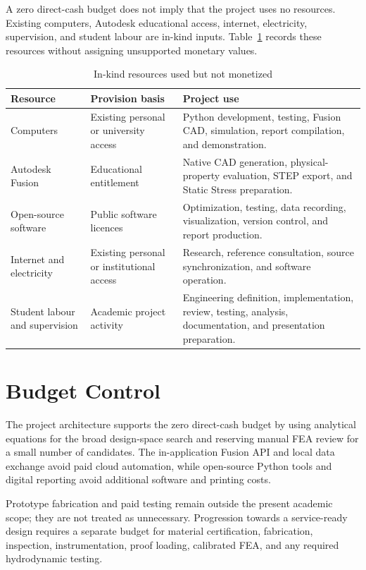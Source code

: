 A zero direct-cash budget does not imply that the project uses no resources.
Existing computers, Autodesk educational access, internet, electricity,
supervision, and student labour are in-kind inputs. Table~\ref{tab:in-kind}
records these resources without assigning unsupported monetary values.

\begin{table}[H]
\centering
\caption{In-kind resources used but not monetized}
\label{tab:in-kind}
\small
\begin{tabularx}{\textwidth}{
    >{\raggedright\arraybackslash}p{}
    >{\raggedright\arraybackslash}X
    >{\raggedright\arraybackslash}X}
\toprule
\textbf{Resource} & \textbf{Provision basis} & \textbf{Project use}\\
\midrule
Computers & Existing personal or university access &
Python development, testing, Fusion CAD, simulation, report compilation, and
demonstration.\\

Autodesk Fusion & Educational entitlement &
Native CAD generation, physical-property evaluation, STEP export, and Static
Stress preparation.\\

Open-source software & Public software licences &
Optimization, testing, data recording, visualization, version control, and
report production.\\

Internet and electricity & Existing personal or institutional access &
Research, reference consultation, source synchronization, and software
operation.\\

Student labour and supervision & Academic project activity &
Engineering definition, implementation, review, testing, analysis,
documentation, and presentation preparation.\\
\bottomrule
\end{tabularx}
\end{table}

\section{Budget Control}
\label{sec:budget-control}

The project architecture supports the zero direct-cash budget by using
analytical equations for the broad design-space search and reserving manual FEA
review for a small number of candidates. The in-application Fusion API and
local data exchange avoid paid cloud automation, while open-source Python tools
and digital reporting avoid additional software and printing costs.

Prototype fabrication and paid testing remain outside the present academic
scope; they are not treated as unnecessary. Progression towards a
service-ready design requires a separate budget for material certification,
fabrication, inspection, instrumentation, proof loading, calibrated FEA, and
any required hydrodynamic testing.
